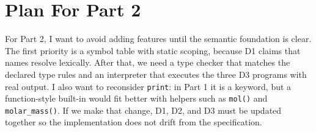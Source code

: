 \documentclass[11pt,a4paper]{article}
\newcommand{\code}[1]{\texttt{#1}}
\begin{document}
\section{Plan For Part 2}

For Part 2, I want to avoid adding features until the semantic foundation is clear. The first priority is a symbol table with static scoping, because D1 claims that names resolve lexically. After that, we need a type checker that matches the declared type rules and an interpreter that executes the three D3 programs with real output. I also want to reconsider \code{print}: in Part 1 it is a keyword, but a function-style built-in would fit better with helpers such as \code{mol()} and \code{molar\_mass()}. If we make that change, D1, D2, and D3 must be updated together so the implementation does not drift from the specification.
\end{document}
